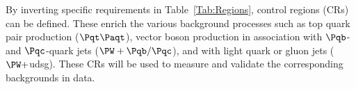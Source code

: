 \documentclass[a4paper,11pt]{article}
\newcommand{\Pb}{{{\Pqb}}\xspace}
\newcommand{\Pt}{{{\Pqt}}\xspace}
\newcommand{\Pc}{{{\Pqc}}\xspace}
\newcommand{\PAt}{{{{\Paqt}}}\xspace}
\begin{document}
By inverting specific requirements in  Table~\ref{Tab:Regions}, control regions (CRs) can be defined. 
These enrich the various background processes 
such as top quark pair production ($\Pt\PAt$), vector boson production in association with $\Pb$- and $\Pc$-quark jets (${\PW}+\Pb/\Pc$), and with light quark or gluon jets (${\PW}+$udsg). 
These CRs will be used to measure and validate the corresponding backgrounds in data.
\end{document}
